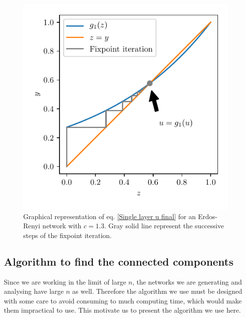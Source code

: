 \documentclass[
11pt, %
english, %
singlespacing, %
nolistspacing, %
liststotoc, %
headsepline, %
]{MastersDoctoralThesis} %
\begin{document}
\begin{figure}
	\includegraphics[scale=1]{u_solution_graphically.pdf}
	\caption{Graphical representation of eq. \eqref{Single layer u final} for an Erdos-Renyi network with $c = 1.3$. Gray solid line represent the successive steps of the fixpoint iteration.}
	\label{Figure: Solution of of u = g1(u) graphically}
\end{figure}

\subsection{Algorithm to find the connected components}

Since we are working in the limit of large $n$, the networks we are generating and analysing have large $n$ as well. Therefore the algorithm we use must be designed with some care to avoid consuming to much computing time, which would make them impractical to use. This motivate us to present the algorithm we use here.
\end{document}
